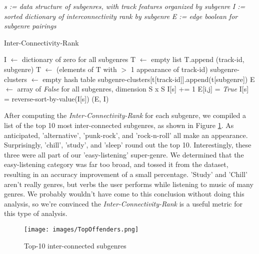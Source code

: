 \documentclass[conference]{IEEEtran}
\begin{document}
\begin{algorithm} 
\textit{s := data structure of subgenres, with track features organized by subgenre}
\newline
\textit{I := sorted dictionary of interconnectivity rank by subgenre}
\newline
\textit{E := edge boolean for subgenre pairings}
\newline
{}
\newline
\begin{algorithmic}[H]
\caption{Inter-Connectivity-Rank}
\STATE I $\gets$ dictionary of zero for all subgenres
\STATE T $\gets$ empty list
\STATE T.append (track-id, subgenre) 
\ENDFOR
\ENDFOR
\STATE T $\gets$ (elements of T with $>$ 1 appearance of track-id)
\STATE subgenre-clusters $\gets$ empty hash table
\STATE subgenre-clusters[t[track-id]].append(t[subgenre])
\ENDFOR
\STATE E $\gets$ array of \emph{False} for all subgenres, dimension S x S
\STATE I[s] += 1
\ENDFOR
{}
\STATE E[i,j] = \emph{True}
\ENDIF
\ENDFOR
\ENDFOR
\STATE I[s] = reverse-sort-by-value(I[s])
\RETURN (E, I)
\end{algorithmic}
\end{algorithm}

After computing the \emph{Inter-Connectivity-Rank} for each subgenre, we compiled a list of the top 10 most inter-connected subgenres, as shown in Figure \ref{fig:Ranking}. As anticipated, 'alternative', 'punk-rock', and 'rock-n-roll' all make an appearance. Surprisingly, 'chill', 'study', and 'sleep' round out the top 10. Interestingly, these three were all part of our 'easy-listening' super-genre. We determined that the easy-listening category was far too broad, and tossed it from the dataset, resulting in an accuracy improvement of a small percentage. 'Study' and 'Chill' aren't really genres, but verbs the user performs while listening to music of many genres. We probably wouldn't have come to this conclusion without doing this analysis, so we're convinced the \emph{Inter-Connectivity-Rank} is a useful metric for this type of analysis. 

\begin{figure}[htbp]
\centerline{\texttt{[image: images/TopOffenders.png]}}
\caption{Top-10 inter-connected subgenres}
\label{fig:Ranking}
\end{figure}
\end{document}
